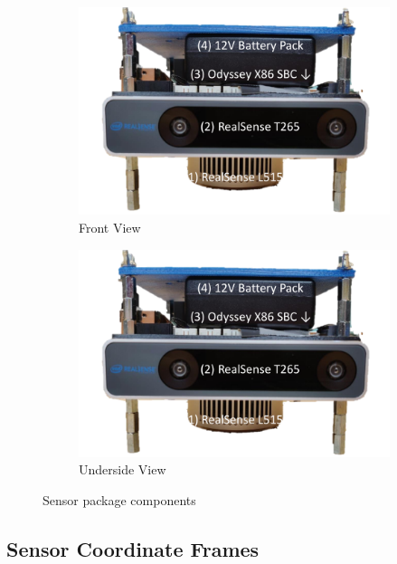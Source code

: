 \begin{figure}[!htb]
  \centering
  \begin{subfigure}[t]{.40\linewidth}
    \centering\includegraphics[page=1,clip,trim=0cm 0cm 0cm 0cm,width=.99\linewidth]{chapter_7_experiments/imgs/sensor_package.pdf}
    \caption{\label{fig:ch7_sensor_package_a}Front View}
  \end{subfigure}
  \begin{subfigure}[t]{.40\linewidth}
    \centering\includegraphics[page=3,clip,trim=0cm 0cm 0cm 0cm,width=.99\linewidth]{chapter_7_experiments/imgs/sensor_package.pdf}
    \caption{\label{fig:ch7_sensor_package_b}Underside View}
  \end{subfigure}
  \caption[Sensor package components]{Sensor package components}\label{fig:ch7_sensor_package_pic}
\end{figure}

\subsection{Sensor Coordinate Frames}


